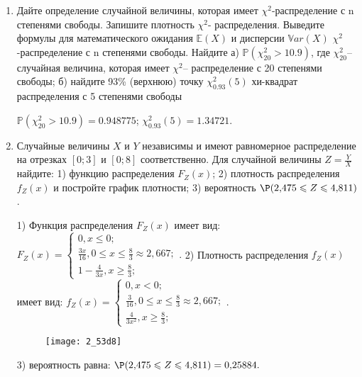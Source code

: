 \documentclass[a4paper,12pt]{article}
\begin{document}
\begin{enumerate}


\item


Дайте определение случайной величины, которая имеет $\chi ^{2}$-распределение с n степенями свободы.
Запишите плотность $\chi ^{2}$- распределения. Выведите формулы для математического ожидания $\mathbb{E}(X)$ и дисперсии $\mathbb{V}ar(X)$ $\chi ^{2}$-распределение с n степенями свободы. Найдите а) $\mathbb{P}(\chi _{20}^{2} > 10.9)$, где $\chi _{20}^{2}$–случайная величина, которая имеет $\chi ^{2}$– распределение с 20 степенями свободы; б) найдите 93\%
(верхнюю) точку $\chi _{0.93}^{2} (5)$ хи-квадрат распределения с 5 степенями свободы




$\mathbb{P}(\chi _{20}^{2} > 10.9) =  0.948775$; $\chi _{0.93}^{2} (5) = 1.34721$.


\item



Случайные величины $X$ и $Y$ независимы и имеют равномерное
распределение на отрезках $[0;3]$ и $[0;8]$ соответственно. Для случайной величины $Z=\frac{Y}{X}$ найдите: 
1) функцию распределения $F_Z(x)$;
2) плотность распределения $f_Z(x)$ и постройте график плотности;
3) вероятность $\P(2,\!475\leqslant Z\leqslant 4,\!811)$.




1) Функция распределения $F_Z(x)$ имеет вид:
$
F_Z(x)=\left\{
\begin{array}{l}
0, x\leqslant 0;\\
\frac{3 x}{16}, 0\leqslant x\leqslant \frac{8}{3}\approx 2,\!667;\\
1 - \frac{4}{3 x}, x\geqslant\frac{8}{3};
\end{array}.
\right.
$
2) Плотность распределения $f_Z(x)$ имеет вид:
$
f_Z(x)=\left\{
\begin{array}{l}
0, x<0;\\
\frac{3}{16}, 0\leqslant x\leqslant \frac{8}{3}\approx 2,\!667;\\
\frac{4}{3 x^{2}}, x\geqslant\frac{8}{3};
\end{array}.
\right.
$


\begin{figure}[H]
    \texttt{[image: 2\_53d8]}
\end{figure}


3) вероятность равна:
$
\P(2,\!475\leqslant Z\leqslant 4,\!811)=
0,\!25884.
$



\end{enumerate}
\end{document}
